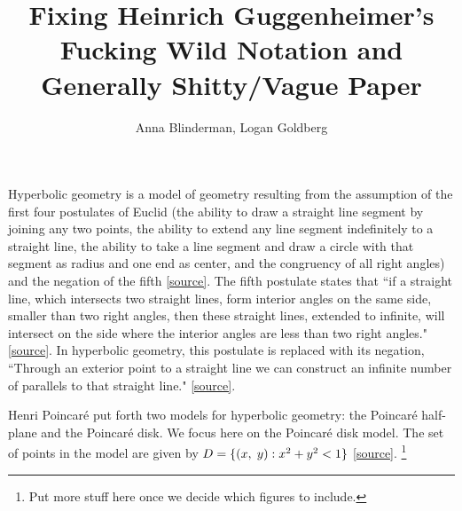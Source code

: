 \documentclass[12pt]{article}
\title{Fixing Heinrich Guggenheimer's Fucking Wild Notation and Generally Shitty/Vague Paper}
\author{Anna Blinderman, Logan Goldberg}
\date{}
\newcommand{\poincare}{Poincar\'{e} }
\newcommand{\ttc}{, \hspace{1mm}}
\begin{document}
\maketitle


Hyperbolic geometry is a model of geometry resulting from the assumption of the first four postulates of Euclid (the ability to draw a straight line segment by joining any two points, the ability to extend any line segment indefinitely to a straight line, the ability to take a line segment and draw a circle with that segment as radius and one end as center, and the congruency of all right angles) and the negation of the fifth \href{http://mathworld.wolfram.com/EuclidsPostulates.html}{[source]}. The fifth postulate states that ``if a straight line, which intersects two straight lines, form interior angles on the same side, smaller than two right angles, then these straight lines, extended to infinite, will intersect on the side where the interior angles are less than two right angles." [\href{https://pdfs.semanticscholar.org/ed0e/d1fee9bbe60b24be373ac1207d17ecb90b4a.pdf}{source}]. In hyperbolic geometry, this postulate is replaced with its negation, ``Through an exterior point to a straight line we can construct an infinite number of parallels to that straight line." \href{https://pdfs.semanticscholar.org/ed0e/d1fee9bbe60b24be373ac1207d17ecb90b4a.pdf}{[source]}.
	
Henri \poincare put forth two models for hyperbolic geometry: the \poincare half-plane and the \poincare disk. We focus here on the \poincare disk model. The set of points in the model are given by $D = \{(x\ttc y): x^2 + y^2 < 1\}$ \href{http://math2.uncc.edu/~frothe/3181alllhyp1_7.pdf}{[source]}.  \footnote{Put more stuff here once we decide which figures to include.} 
	
\end{document}
